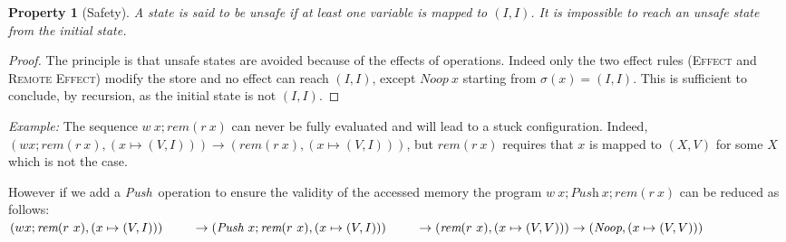 \documentclass[preprint,12pt]{elsarticle}
\newcommand{\symb}[1]{\textit{#1}}
\newcommand{\noop}{\symb{Noop}}
\newcommand{\Push}{\symb{Push}}
\newcommand{\rem}[1]{\symb{rem}(#1)}
\newtheorem{Property}{Property}
\newenvironment{example}{\smallskip\par\noindent\emph{Example:}}{\medskip}
\begin{document}
\begin{Property}[Safety]\label{prop:safe}
A state is said to be \emph{unsafe} if at least one variable is mapped to 
$(I,I)$.
It is impossible to reach an unsafe state from the initial state.
\end{Property}
\begin{proof}
The principle is that unsafe states are avoided  because of the effects of operations. Indeed 
only the two effect rules (\textsc{Effect} and \textsc{Remote Effect}) modify the store and no effect can reach $(I,I)$, except 
$\noop\ x$ starting from $\sigma(x)=(I,I)$. This is sufficient to conclude, by recursion, as the initial state is not $(I,I)$.
\end{proof}

\begin{example} The sequence
   $w~ x;\rem{r~x}$ can never be fully evaluated and will lead to a stuck configuration. Indeed, $(w x;\rem{r~x},(x\mapsto 
    (V,I)))\to (\rem{r~x},(x\mapsto (V,I)))$, but  $\rem{r~x}$ requires that $x$ is 
    mapped to $(X,V)$ for some $X$ which is not the case.

However if we add a \Push\ operation to ensure the validity of the accessed memory the 
program $w~x;\Push~x;\rem{r~x}$ can be reduced as follows:\\
$(w x;\rem{r~x},(x\mapsto (V,I)))\\~\qquad\to (\Push~x;\rem{r~x},(x\mapsto 
(V,I)))\\~\qquad\to 
(\rem{r~x},(x\mapsto (V,V)))\to (\noop,(x\mapsto (V,V)))$
\end{example}
 
\end{document}
